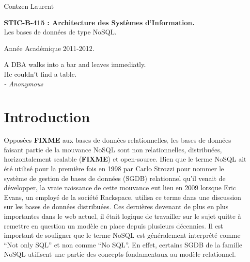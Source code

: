 \documentclass[11pt]{article}
\author{Contzen Laurent}
\begin{document}
\begin{titlepage}  
  \begin{flushleft}
    Contzen Laurent
  \end{flushleft}
  \begin{center}
    \vspace{80mm}\LARGE{\textbf{STIC-B-415 : Architecture des Systèmes d'Information.} \\    
      Les bases de données de type NoSQL.}
  \end{center}
  \begin{flushright}
    \vspace{90mm}
    Année Académique 2011-2012.             
  \end{flushright}
\end{titlepage}

\vspace*{\fill}
\begin{flushright}
  A DBA walks into a bar and leaves immediatly. \\
  He couldn't find a table. \\
  \textit{- Anonymous}
\end{flushright}
\vspace*{\fill}
\newpage
\tableofcontents
\newpage
\listoffigures
\newpage

\section{Introduction}
Opposées \colorbox{BrickRed}{\textbf{FIXME}} aux bases de données relationnelles, les bases de données faisant partie de la mouvance NoSQL sont non relationnelles, distribuées, horizontalement scalable (\colorbox{BrickRed}{\textbf{FIXME}}) et open-source. Bien que le terme NoSQL ait été utilisé pour la première fois en 1998 par Carlo Strozzi pour nommer le système de gestion de bases de données (SGDB) relationnel qu'il venait de développer, la vraie naissance de cette mouvance eut lieu en 2009 lorsque Eric Evans, un employé de la société Rackspace, utilisa ce terme dans une discussion sur les bases de données distribuées. Ces dernières devenant de plus en plus importantes dans le web actuel, il était logique de travailler sur le sujet quitte à remettre en question un modèle en place depuis plusieurs décennies. Il est important de souligner que le terme NoSQL est généralement interprété comme ``Not only SQL'' et non comme ``No SQL''. En effet, certains SGDB de la famille NoSQL utilisent une partie des concepts fondamentaux au modèle relationnel.
\end{document}
